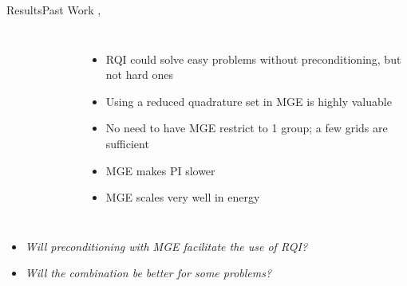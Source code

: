 \documentclass[final]{beamer}
\begin{document}
\begin{frame}{}
\begin{columns}[t]
\begin{column}{.3\linewidth}
\begin{block}{\large Results\textemdash Past Work 
		              \cite{Slaybaugh2012}, \cite{Slaybaugh2013}}
\begin{columns}
\begin{figure}[h!]
	\end{figure}
	\begin{itemize}
	\item{RQI could solve easy problems without preconditioning, but not hard ones}
	\item{Using a reduced quadrature set in MGE is highly valuable}
	\item{No need to have MGE restrict to 1 group; a few grids are sufficient}
	\item{MGE makes PI slower}
	\item{MGE scales very well in energy}
	\end{itemize}
\end{columns}
\vspace*{0.5 em}
	\begin{itemize}
	\item{\textit{Will preconditioning with MGE facilitate the use of RQI?}}
	\item{\textit{Will the combination be better for some problems?}}
	\end{itemize}
		\end{block}
	\vfill
      \end{column}



\end{columns}
\end{frame}
\end{document}
